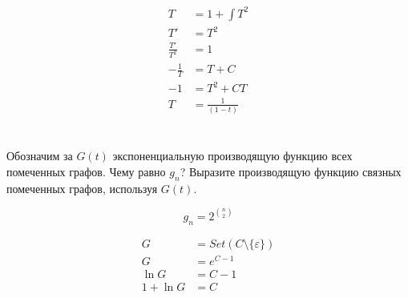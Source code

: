 \begin{align*}
    T              & = 1 + \int T^2      \\
    T'             & = T^2               \\
    \frac{T'}{T^2} & = 1                 \\
    - \frac{1}{T}  & = T + C             \\
    - 1            & = T^2 + CT          \\
    T              & = \frac{1}{(1 - t)}
\end{align*}

\section{}
Обозначим за \(G(t)\) экспоненциальную производящую функцию всех помеченных графов. Чему равно \(g_n\)? Выразите производящую функцию связных помеченных графов, используя \(G(t)\).

\[g_n = 2^{\binom{n}{2}}\]

\begin{align*}
    G         & = Set(C \setminus \{\varepsilon\}) \\
    G         & = e^{C - 1}                        \\
    \ln G     & = C - 1                            \\
    1 + \ln G & = C                                \\
\end{align*}

